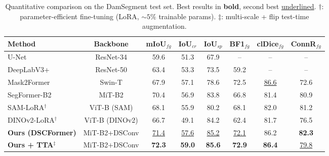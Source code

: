 \begin{table}[t]
\centering
\caption{Quantitative comparison on the DamSegment test set. Best results in \textbf{bold}, second best \underline{underlined}. $\dagger$: parameter-efficient fine-tuning (LoRA, ${\sim}5\%$ trainable params). $\ddagger$: multi-scale + flip test-time augmentation.}
\label{tab:main_comparison}
\begin{tabular}{lccccccc}
\toprule
Method & Backbone & mIoU$_{fg}$ & IoU$_{cr}$ & IoU$_{sp}$ & BF1$_{fg}$ & clDice$_{fg}$ & ConnR$_{fg}$ \\
\midrule
U-Net & ResNet-34 & 59.6 & 51.3 & 67.9 & -- & -- & -- \\
DeepLabV3+ & ResNet-50 & 63.4 & 53.3 & 73.5 & 59.2 & -- & -- \\
Mask2Former & Swin-T & 67.9 & 57.1 & 78.6 & 72.5 & \underline{86.6} & 72.6 \\
SegFormer-B2 & MiT-B2 & 70.4 & 56.9 & 83.8 & 66.8 & 81.4 & 80.9 \\
SAM-LoRA$^\dagger$ & ViT-B (SAM) & 68.1 & 55.9 & 80.2 & 68.1 & 82.0 & 81.2 \\
DINOv2-LoRA$^\dagger$ & ViT-B (DINOv2) & 66.7 & 49.1 & 84.2 & 62.4 & 81.7 & 76.5 \\
\midrule
\textbf{Ours (DSCFormer)} & MiT-B2+DSConv & \underline{71.4} & \underline{57.6} & \underline{85.2} & \underline{72.1} & 86.2 & \textbf{82.3} \\
\textbf{Ours + TTA}$^\ddagger$ & MiT-B2+DSConv & \textbf{72.3} & \textbf{59.0} & \textbf{85.6} & \textbf{72.9} & \textbf{86.4} & \underline{79.8} \\
\bottomrule
\end{tabular}
\end{table}
